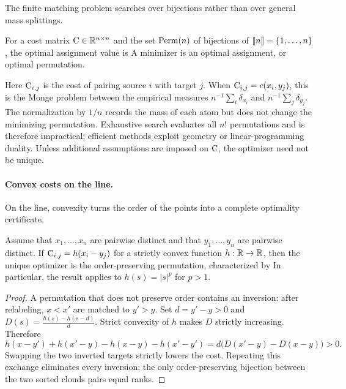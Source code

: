The finite matching problem searches over bijections rather than over general mass splittings.
\begin{defn}\label{def-optimal-assignment}
For a cost matrix $\mathrm{C}\in\mathbb{R}^{n\times n}$ and the set $\mathrm{Perm}(n)$ of bijections of $\llbracket n\rrbracket=\{1,\ldots,n\}$, the optimal assignment value is
	A minimizer is an optimal assignment, or optimal permutation.
\end{defn}
Here $\mathrm{C}_{i,j}$ is the cost of pairing source $i$ with target $j$.
When $\mathrm{C}_{i,j}=c(x_i,y_j)$, this is the Monge problem between the empirical measures $n^{-1}\sum_i\delta_{x_i}$ and $n^{-1}\sum_j\delta_{y_j}$. The normalization by $1/n$ records the mass of each atom but does not change the minimizing permutation. Exhaustive search evaluates all $n!$ permutations and is therefore impractical; efficient methods exploit geometry or linear-programming duality. Unless additional assumptions are imposed on $\mathrm{C}$, the optimizer need not be unique.

\paragraph{Convex costs on the line.}

On the line, convexity turns the order of the points into a complete optimality certificate.

\begin{proposition}\label{prop-matching-1d-monotone}
Assume that $x_1,\ldots,x_n$ are pairwise distinct and that $y_1,\ldots,y_n$ are pairwise distinct. If $\mathrm{C}_{i,j}=h(x_i-y_j)$ for a strictly convex function $h:\mathbb{R}\to\mathbb{R}$, then the unique optimizer is the order-preserving permutation, characterized by
In particular, the result applies to $h(s)=|s|^p$ for $p>1$.
\end{proposition}
\begin{proof}
	A permutation that does not preserve order contains an inversion: after relabeling, $x<x'$ are matched to $y'>y$. Set $d=y'-y>0$ and
	\(D(s)=\frac{h(s)-h(s-d)}{d}\).
	Strict convexity of $h$ makes $D$ strictly increasing. Therefore
		\[
			h(x-y')+h(x'-y)-h(x-y)-h(x'-y')
			=d\bigl(D(x'-y)-D(x-y)\bigr)>0.
		\]
	Swapping the two inverted targets strictly lowers the cost. Repeating this exchange eliminates every inversion; the only order-preserving bijection between the two sorted clouds pairs equal ranks.
\end{proof}

